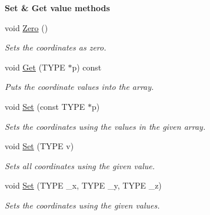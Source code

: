 \begin{Indent}\textbf{ Set \& Get value methods}\par
\begin{DoxyCompactItemize}
\item 
\mbox{\label{classcy_1_1_point3_a03897a18c919269554d5af8bbbfc4ce3}} 
void \mbox{\hyperlink{classcy_1_1_point3_a03897a18c919269554d5af8bbbfc4ce3}{Zero}} ()
\begin{DoxyCompactList}\small\item\em Sets the coordinates as zero. \end{DoxyCompactList}\item 
\mbox{\label{classcy_1_1_point3_a1b4d35472c5d034956009d4793593dca}} 
void \mbox{\hyperlink{classcy_1_1_point3_a1b4d35472c5d034956009d4793593dca}{Get}} (T\+Y\+PE $\ast$p) const
\begin{DoxyCompactList}\small\item\em Puts the coordinate values into the array. \end{DoxyCompactList}\item 
\mbox{\label{classcy_1_1_point3_a57f7ef32508ec0c1754d99ebd7338e7f}} 
void \mbox{\hyperlink{classcy_1_1_point3_a57f7ef32508ec0c1754d99ebd7338e7f}{Set}} (const T\+Y\+PE $\ast$p)
\begin{DoxyCompactList}\small\item\em Sets the coordinates using the values in the given array. \end{DoxyCompactList}\item 
\mbox{\label{classcy_1_1_point3_a00f402768f7337962d1f463ba71d1cef}} 
void \mbox{\hyperlink{classcy_1_1_point3_a00f402768f7337962d1f463ba71d1cef}{Set}} (T\+Y\+PE v)
\begin{DoxyCompactList}\small\item\em Sets all coordinates using the given value. \end{DoxyCompactList}\item 
\mbox{\label{classcy_1_1_point3_a20128f442724ba20074f5dc41cfc4e12}} 
void \mbox{\hyperlink{classcy_1_1_point3_a20128f442724ba20074f5dc41cfc4e12}{Set}} (T\+Y\+PE \+\_\+x, T\+Y\+PE \+\_\+y, T\+Y\+PE \+\_\+z)
\begin{DoxyCompactList}\small\item\em Sets the coordinates using the given values. \end{DoxyCompactList}\end{DoxyCompactItemize}
\end{Indent}
